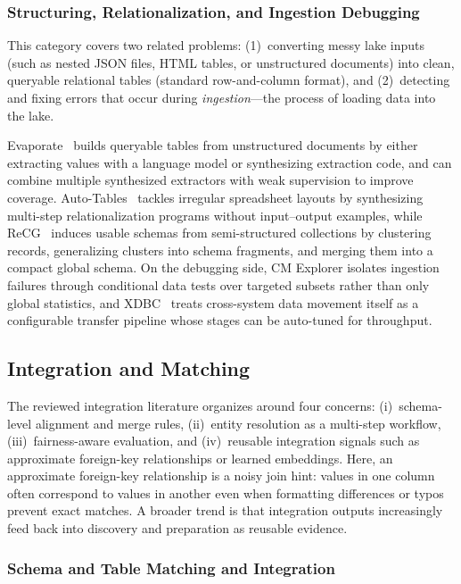 \documentclass[sigconf]{acmart}
\begin{document}
\subsubsection{Structuring, Relationalization, and Ingestion Debugging}
This category covers two related problems: (1)~converting messy lake inputs (such as nested JSON files, HTML tables, or unstructured documents) into clean, queryable relational tables (standard row-and-column format), and (2)~detecting and fixing errors that occur during \emph{ingestion}---the process of loading data into the lake.

Evaporate~\cite{10.14778/3626292.3626294} builds queryable tables from unstructured documents by either extracting values with a language model or synthesizing extraction code, and can combine multiple synthesized extractors with weak supervision to improve coverage. Auto-Tables~\cite{10.1145/3665252.3665269} tackles irregular spreadsheet layouts by synthesizing multi-step relationalization programs without input--output examples, while ReCG~\cite{10.14778/3681954.3682019} induces usable schemas from semi-structured collections by clustering records, generalizing clusters into schema fragments, and merging them into a compact global schema. On the debugging side, CM Explorer isolates ingestion failures through conditional data tests over targeted subsets rather than only global statistics, and XDBC~\cite{10.1145/3725294} treats cross-system data movement itself as a configurable transfer pipeline whose stages can be auto-tuned for throughput.


\subsection{Integration and Matching}

The reviewed integration literature organizes around four concerns: (i)~schema-level alignment and merge rules, (ii)~entity resolution as a multi-step workflow, (iii)~fairness-aware evaluation, and (iv)~reusable integration signals such as approximate foreign-key relationships or learned embeddings. Here, an approximate foreign-key relationship is a noisy join hint: values in one column often correspond to values in another even when formatting differences or typos prevent exact matches. A broader trend is that integration outputs increasingly feed back into discovery and preparation as reusable evidence.


\subsubsection{Schema and Table Matching and Integration}
\label{sec:lit-sm-integration}
\end{document}
